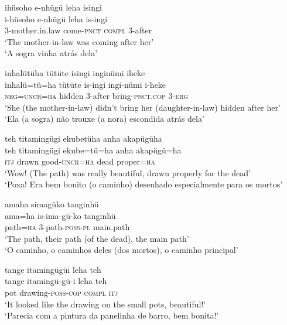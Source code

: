 \documentclass[output=paper,
modfonts,nonflat
]{langsci/langscibook}
\begin{document}
\ea ihüsoho e-nhügü leha isingi \\[.3em]
\gll i-hüsoho	e-nhügü	leha	is-ingi \\
3-mother.in.law	come-\textsc{pnct} 	\textsc{compl}	3-after \\
\glt ‘The mother-in-law was coming after her’ \\
‘A sogra vinha atrás dela’ \\
\z

\ea inhalütüha tütüte isingi inginümi iheke \\[.3em]
\gll inhalü=tü=ha	tütüte	 is-ingi	ingi-nümi		i-heke \\
\textsc{neg=uncr=ha}	hidden	3-after 	bring-\textsc{pnct.cop} 	3-\textsc{erg} \\
\glt ‘She (the mother-in-law) didn’t bring her (daughter-in-law) hidden after her’ \\
‘Ela (a sogra) não trouxe (a nora) escondida atrás dela’ \\
\z

\ea teh titamingügi ekubetüha anha akapügüha \\[.3em]
\gll teh	titamingügi	ekube=tü=ha	anha	akapügü=ha \\
\textsc{itj}	drawn		good\textsc{-uncr=ha} 	dead 	proper=\textsc{ha} \\
\glt ‘Wow! (The path) was really beautiful, drawn properly for the dead’ \\
‘Poxa! Era bem bonito (o caminho) desenhado especialmente para os mortos’ \\ 
\z

\ea amaha simagüko tanginhü \\[.3em]
\gll ama=ha	is-ima-gü-ko	tanginhü \\
path=\textsc{ha}	3-path-\textsc{poss}-\textsc{pl}	main.path \\
\glt ‘The path, their path (of the dead), the main path’ \\
‘O caminho, o caminhos deles (dos mortos), o caminho principal’ \\
\z

\ea tange itamingügüi leha teh \\[.3em]
\gll tange	itamingü-gü-i		leha	teh \\
pot 	drawing-\textsc{poss-cop}	\textsc{compl}	\textsc{itj} \\
\glt ‘It looked like the drawing on the small pots, beautiful!’ \\
‘Parecia com a pintura da panelinha de barro, bem bonita!’ \\
\z
\end{document}
